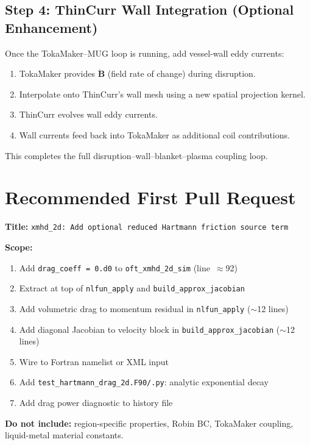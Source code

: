 \documentclass[11pt,letterpaper]{article}
\begin{document}
\subsection{Step 4: ThinCurr Wall Integration (Optional Enhancement)}

Once the TokaMaker--MUG loop is running, add vessel-wall eddy currents:
\begin{enumerate}
  \item TokaMaker provides $\dot{\mathbf{B}}$ (field rate of change) during
    disruption.
  \item Interpolate onto ThinCurr's wall mesh using a new spatial projection
    kernel.
  \item ThinCurr evolves wall eddy currents.
  \item Wall currents feed back into TokaMaker as additional coil contributions.
\end{enumerate}
This completes the full disruption--wall--blanket--plasma coupling loop.

\section{Recommended First Pull Request}

\textbf{Title:} \texttt{xmhd\_2d: Add optional reduced Hartmann friction source term}

\textbf{Scope:}
\begin{enumerate}
  \item Add \texttt{drag\_coeff = 0.d0} to \texttt{oft\_xmhd\_2d\_sim} (line~$\approx$92)
  \item Extract at top of \texttt{nlfun\_apply} and \texttt{build\_approx\_jacobian}
  \item Add volumetric drag to momentum residual in \texttt{nlfun\_apply} ($\sim$12 lines)
  \item Add diagonal Jacobian to velocity block in \texttt{build\_approx\_jacobian} ($\sim$12 lines)
  \item Wire to Fortran namelist or XML input
  \item Add \texttt{test\_hartmann\_drag\_2d.F90/.py}: analytic exponential decay
  \item Add drag power diagnostic to history file
\end{enumerate}

\textbf{Do not include:} region-specific properties, Robin BC, TokaMaker coupling,
liquid-metal material constants.
\end{document}
